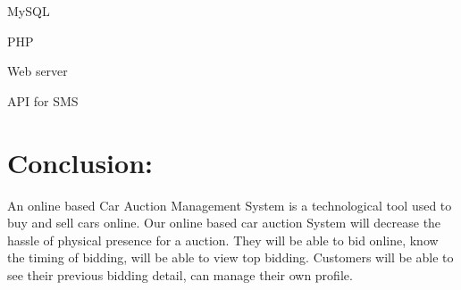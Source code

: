 \documentclass{report}
\begin{document}
	MySQL
	
	PHP
	
	Web server
	
	API for SMS

\section*{Conclusion:}

An online based Car Auction Management System is a technological tool used to buy and sell cars online. Our online based car auction System will decrease the hassle of physical presence for a auction. They will be able to bid online, know the timing of bidding, will be able to view top bidding. Customers will be able to see their previous bidding detail, can manage their own profile. 
\end{document}
